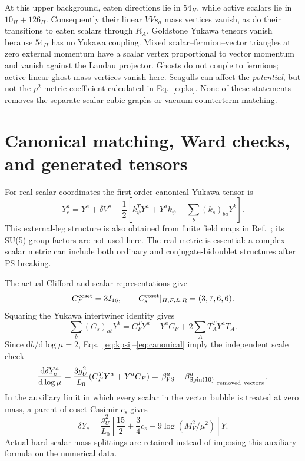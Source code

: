 \documentclass[11pt]{article}
\newcommand{\dd}{\mathrm d}
\begin{document}
At this upper background, eaten directions lie in $54_H$, while active
scalars lie in $10_H+126_H$. Consequently their linear $VV s_a$ mass
vertices vanish, as do their transitions to eaten scalars through $R_A$.
Goldstone Yukawa tensors vanish because $54_H$ has no Yukawa coupling.
Mixed scalar--fermion--vector triangles at zero external momentum have a
scalar vertex proportional to vector momentum and vanish against the
Landau projector. Ghosts do not couple to fermions; active linear ghost
mass vertices vanish here. Seagulls can affect the \emph{potential}, but
not the $p^2$ metric coefficient calculated in Eq.~\eqref{eq:ks}. None of
these statements removes the separate scalar-cubic graphs or vacuum
counterterm matching.

\section{Canonical matching, Ward checks, and generated tensors}
For real scalar coordinates the first-order canonical Yukawa tensor is
\begin{equation}\label{eq:canonical}
 Y_c^a=Y^a+\delta V^a-\frac12\left[
 k_\psi^T Y^a+Y^a k_\psi+\sum_b(k_s)_{ba}Y^b\right].
\end{equation}
This external-leg structure is also obtained from finite field maps in
Ref.~\cite{patel}; its SU(5) group factors are not used here.
The real metric is essential: a complex scalar metric can include both
ordinary and conjugate-bidoublet structures after PS breaking.

The actual Clifford and scalar representations give
\begin{equation}
 C_F^{\rm coset}=3I_{16},\qquad
 C_s^{\rm coset}|_{H,F,L,R}=(3,7,6,6).
\end{equation}
Squaring the Yukawa intertwiner identity gives
\begin{equation}
 \sum_b(C_s)_{ab}Y^b=C_F^TY^a+Y^aC_F
                 +2\sum_A T_A^TY^aT_A.\label{eq:ward}
\end{equation}
Since $\dd b/\dd\log\mu=2$, Eqs.~\eqref{eq:kpsi}--\eqref{eq:canonical}
imply the independent scale check
\begin{equation}\label{eq:scale}
 \frac{\dd\delta Y_c^a}{\dd\log\mu}
 =\frac{3g_U^2}{L_0}(C_F^TY^a+Y^aC_F)
 =\left.\beta_{\rm PS}^a-\beta_{\rm Spin(10)}^a\right|_{\rm removed\ vectors}.
\end{equation}
In the auxiliary limit in which every scalar in the vector bubble is
treated at zero mass, a parent of coset Casimir $c_s$ gives
\begin{equation}
 \delta Y_c=\frac{g_U^2}{L_0}
 \left[\frac{15}{2}+\frac34 c_s
                 -9\log(M_V^2/\mu^2)\right]Y.
\end{equation}
Actual hard scalar mass splittings are retained instead of imposing this
auxiliary formula on the numerical data.
\end{document}
